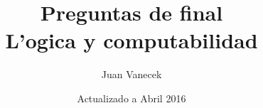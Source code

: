 \documentclass{exam}
\begin{document}
\title{Preguntas de final \\  L'ogica y computabilidad}
\author{Juan Vanecek}
\date{Actualizado a Abril 2016}
\begin{titlepage}
 \maketitle
\end{titlepage}




\newpage


\end{document}
